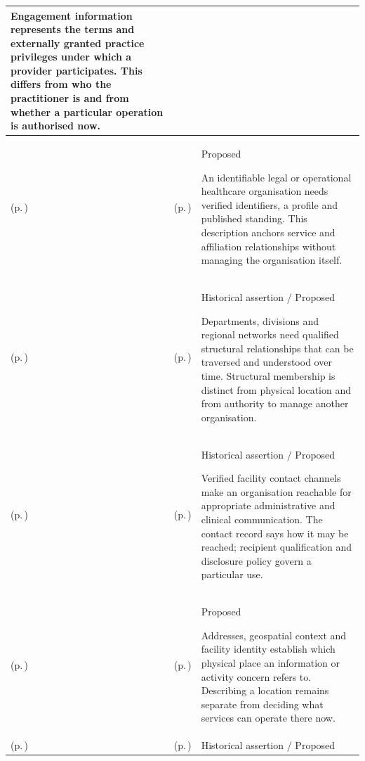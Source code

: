 \begin{longtable}{|>{\raggedright\arraybackslash}p{0.27\TableWidth}|>{\raggedright\arraybackslash}p{0.27\TableWidth}|>{\raggedright\arraybackslash}p{0.46\TableWidth}|}
Engagement information represents the terms and externally granted practice privileges under which a provider participates. This differs from who the practitioner is and from whether a particular operation is authorised now.\\\hline
\nameref{cap:bec-organisation-administration} (p.\,\pageref{cap:bec-organisation-administration}) & \nameref{cap:bec-healthcare-organisation} (p.\,\pageref{cap:bec-healthcare-organisation}) & Proposed

An identifiable legal or operational healthcare organisation needs verified identifiers, a profile and published standing. This description anchors service and affiliation relationships without managing the organisation itself.\\\hline
\nameref{cap:bec-organisation-administration} (p.\,\pageref{cap:bec-organisation-administration}) & \nameref{cap:bec-organisational-structure} (p.\,\pageref{cap:bec-organisational-structure}) & Historical assertion / Proposed

Departments, divisions and regional networks need qualified structural relationships that can be traversed and understood over time. Structural membership is distinct from physical location and from authority to manage another organisation.\\\hline
\nameref{cap:bec-organisation-administration} (p.\,\pageref{cap:bec-organisation-administration}) & \nameref{cap:bec-organisation-contact} (p.\,\pageref{cap:bec-organisation-contact}) & Historical assertion / Proposed

Verified facility contact channels make an organisation reachable for appropriate administrative and clinical communication. The contact record says how it may be reached; recipient qualification and disclosure policy govern a particular use.\\\hline
\nameref{cap:bec-location-administration} (p.\,\pageref{cap:bec-location-administration}) & \nameref{cap:bec-healthcare-location} (p.\,\pageref{cap:bec-healthcare-location}) & Proposed

Addresses, geospatial context and facility identity establish which physical place an information or activity concern refers to. Describing a location remains separate from deciding what services can operate there now.\\\hline
\nameref{cap:bec-location-administration} (p.\,\pageref{cap:bec-location-administration}) & \nameref{cap:bec-location-structure} (p.\,\pageref{cap:bec-location-structure}) & Historical assertion / Proposed


\end{longtable}
